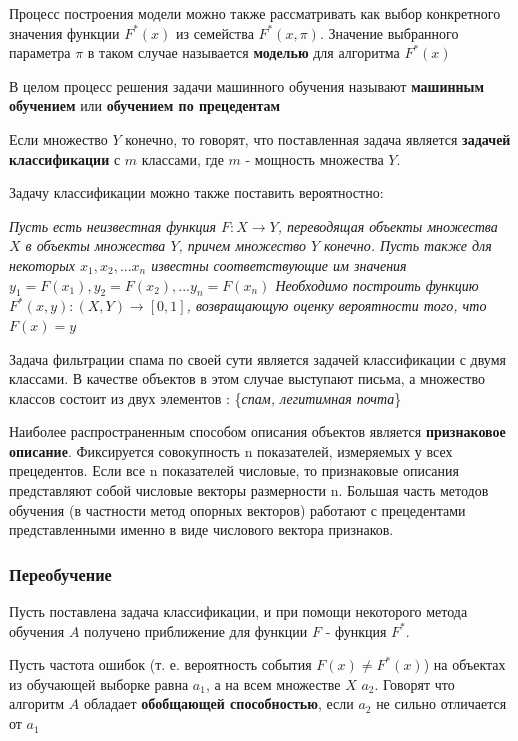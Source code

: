 Процесс построения модели можно также рассматривать как выбор конкретного значения функции $F^*(x)$ из семейства $F^*(x, \pi)$. Значение выбранного параметра $\pi$ в таком случае называется \textbf{моделью} для алгоритма
$F^*(x)$

В целом процесс решения задачи машинного обучения называют \textbf{машинным обучением} или \textbf{обучением по прецедентам}

Если множество $Y$ конечно, то говорят, что поставленная задача  является \textbf{задачей классификации} с $m$ классами, где $m$ - мощность множества $Y$.

Задачу классификации можно также поставить вероятностно:

\textit {
Пусть есть неизвестная функция $F: X \rightarrow Y$, переводящая объекты
множества $X$ в объекты множества $Y$, причем множество $Y$ конечно. Пусть также для некоторых $x_1, x_2, ... x_n$ известны соответствующие им значения $y_1 = F(x_1), y_2 = F(x_2), ... y_n = F(x_n)$ Необходимо построить функцию $F^*(x, y): (X, Y) \rightarrow [0, 1]$, возвращающую оценку вероятности того, что $F(x)=y$
}

Задача фильтрации спама по своей сути является задачей классификации с двумя классами. В качестве объектов в этом случае выступают письма, а множество классов состоит из двух элементов : \{\textit{спам, легитимная почта}\}

Наиболее распространенным способом описания объектов является \textbf{признаковое описание}. Фиксируется совокупность n показателей, измеряемых у всех прецедентов. Если все n показателей числовые, то признаковые описания представляют собой числовые векторы размерности n. Большая часть методов обучения (в частности метод опорных векторов) работают с прецедентами представленными именно в виде числового вектора признаков.


\subsubsection{Переобучение}
\label{overfitting}
Пусть поставлена задача классификации, и при помощи некоторого метода обучения $A$ получено приближение для функции $F$ - функция $F^*$. 

Пусть частота ошибок (т. е. вероятность события $F(x) \neq F^*(x)$) на объектах из обучающей выборке равна $a_1$, а на всем множестве $X$ $a_2$. Говорят что алгоритм $A$ обладает \textbf{обобщающей способностью}, если $a_2$ не сильно отличается от $a_1$


